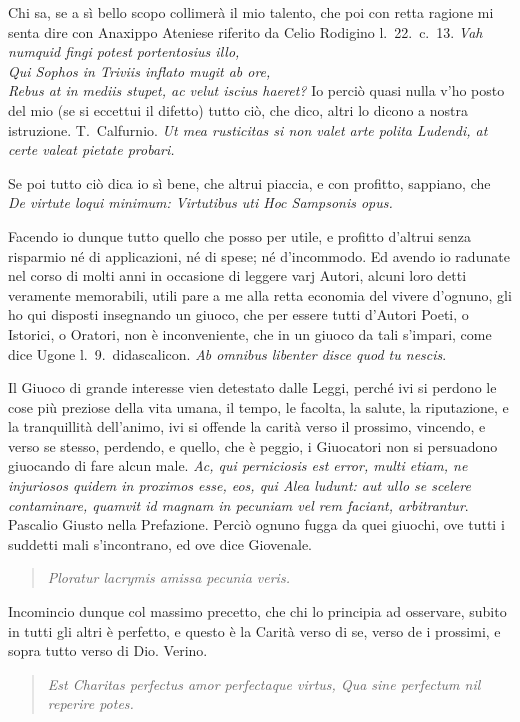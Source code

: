 \documentclass[11pt,a6paper]{article}
\newcommand{\literaryquote}[1]{%
\kern -6pt  \begin{verse}
    {\footnotesize \it #1}
  \end{verse}\kern -2pt%
}
\begin{document}
Chi sa, se a sì bello scopo collimerà il mio
talento, che poi con retta ragione mi senta
dire con Anaxippo Ateniese riferito da Celio
Rodigino l.\ 22.\ c.\ 13.
\textit{Vah numquid fingi potest portentosius illo,\\
Qui Sophos in Triviis inflato mugit ab ore,\\
Rebus at in mediis stupet, ac velut iscius haeret?}
Io perciò quasi nulla v'ho posto del mio (se
si eccettui il difetto) tutto ciò, che dico,
altri lo dicono a nostra istruzione. T.~Calfurnio.
\textit{Ut mea rusticitas si non valet arte polita
 Ludendi, at certe valeat pietate probari.}

Se poi tutto ciò dica io sì bene, che altrui
piaccia, e con profitto, sappiano, che
\textit{De virtute loqui minimum: Virtutibus uti
Hoc Sampsonis opus.}

Facendo io dunque tutto quello che posso per
utile, e profitto d'altrui senza risparmio né di
applicazioni, né di spese; né d'incommodo.
Ed avendo io radunate nel corso di molti anni
in occasione di leggere varj Autori, alcuni
loro detti veramente memorabili, utili pare
a me alla retta economia del vivere d'ognuno,
gli ho qui disposti insegnando un giuoco, che
per essere tutti d'Autori Poeti, o Istorici, o
Oratori, non è inconveniente, che in un
giuoco da tali s'impari, come dice Ugone
l.\ 9.\ didascalicon. \textit{Ab omnibus libenter disce
quod tu nescis}.


Il Giuoco di grande interesse vien detestato
dalle Leggi, perché ivi si perdono le cose
più preziose della vita umana, il tempo, le
facolta, la salute, la riputazione, e la
tranquillità dell'animo, ivi si offende la carità
verso il prossimo, vincendo, e verso se stesso,
perdendo, e quello, che è peggio, i Giuocatori
non si persuadono giuocando di fare alcun
male. \textit{Ac, qui perniciosis est error, multi
 etiam, ne injuriosos quidem in proximos esse,
 eos, qui Alea ludunt: aut ullo se scelere
 contaminare, quamvit id magnam in pecuniam
 vel rem faciant, arbitrantur}. Pascalio
Giusto nella Prefazione. Perciò ognuno
fugga da quei giuochi, ove tutti i suddetti
mali s'incontrano, ed ove dice Giovenale.

\literaryquote{Ploratur lacrymis amissa pecunia veris.}

Incomincio dunque col massimo precetto,
che chi lo principia ad osservare, subito in
tutti gli altri è perfetto, e questo è la Carità
verso di se, verso de i prossimi, e sopra tutto
verso di Dio. Verino.

\literaryquote{Est Charitas perfectus amor perfectaque virtus,
Qua sine perfectum nil reperire potes.}
\end{document}
